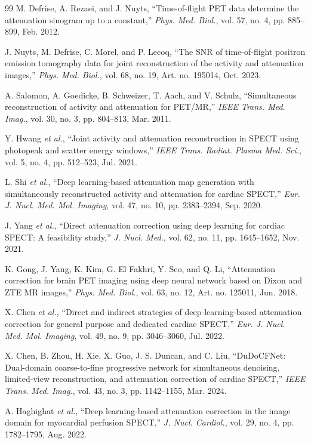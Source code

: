 \documentclass[11pt, a4paper]{article}
\begin{document}
\begin{thebibliography}{99}
 M. Defrise, A. Rezaei, and J. Nuyts, ``Time-of-flight PET data determine the attenuation sinogram up to a constant,'' \textit{Phys. Med. Biol.}, vol. 57, no. 4, pp. 885--899, Feb. 2012.

 J. Nuyts, M. Defrise, C. Morel, and P. Lecoq, ``The SNR of time-of-flight positron emission tomography data for joint reconstruction of the activity and attenuation images,'' \textit{Phys. Med. Biol.}, vol. 68, no. 19, Art. no. 195014, Oct. 2023.

 A. Salomon, A. Goedicke, B. Schweizer, T. Aach, and V. Schulz, ``Simultaneous reconstruction of activity and attenuation for PET/MR,'' \textit{IEEE Trans. Med. Imag.}, vol. 30, no. 3, pp. 804--813, Mar. 2011.

 Y. Hwang \textit{et al.}, ``Joint activity and attenuation reconstruction in SPECT using photopeak and scatter energy windows,'' \textit{IEEE Trans. Radiat. Plasma Med. Sci.}, vol. 5, no. 4, pp. 512--523, Jul. 2021.

 L. Shi \textit{et al.}, ``Deep learning-based attenuation map generation with simultaneously reconstructed activity and attenuation for cardiac SPECT,'' \textit{Eur. J. Nucl. Med. Mol. Imaging}, vol. 47, no. 10, pp. 2383--2394, Sep. 2020.

 J. Yang \textit{et al.}, ``Direct attenuation correction using deep learning for cardiac SPECT: A feasibility study,'' \textit{J. Nucl. Med.}, vol. 62, no. 11, pp. 1645--1652, Nov. 2021.

 K. Gong, J. Yang, K. Kim, G. El Fakhri, Y. Seo, and Q. Li, ``Attenuation correction for brain PET imaging using deep neural network based on Dixon and ZTE MR images,'' \textit{Phys. Med. Biol.}, vol. 63, no. 12, Art. no. 125011, Jun. 2018.

 X. Chen \textit{et al.}, ``Direct and indirect strategies of deep-learning-based attenuation correction for general purpose and dedicated cardiac SPECT,'' \textit{Eur. J. Nucl. Med. Mol. Imaging}, vol. 49, no. 9, pp. 3046--3060, Jul. 2022.

 X. Chen, B. Zhou, H. Xie, X. Guo, J. S. Duncan, and C. Liu, ``DuDoCFNet: Dual-domain coarse-to-fine progressive network for simultaneous denoising, limited-view reconstruction, and attenuation correction of cardiac SPECT,'' \textit{IEEE Trans. Med. Imag.}, vol. 43, no. 3, pp. 1142--1155, Mar. 2024.

 A. Haghighat \textit{et al.}, ``Deep learning-based attenuation correction in the image domain for myocardial perfusion SPECT,'' \textit{J. Nucl. Cardiol.}, vol. 29, no. 4, pp. 1782--1795, Aug. 2022.


\end{thebibliography}
\end{document}
